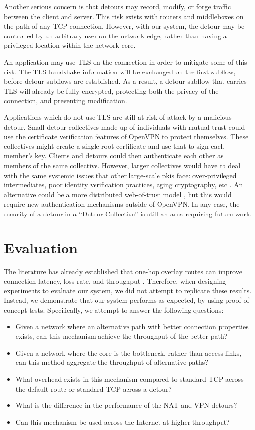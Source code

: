 \documentclass{cwru}
\begin{document}
Another serious concern is that detours may record, modify, or forge traffic
between the client and server. This risk exists with routers and middleboxes on
the path of any TCP connection. However, with our system, the detour may be
controlled by an arbitrary user on the network edge, rather than having a
privileged location within the network core.

An application may use TLS on the connection in order to mitigate some of this
risk. The TLS handshake information will be exchanged on the first subflow,
before detour subflows are established. As a result, a detour subflow that
carries TLS will already be fully encrypted, protecting both the privacy of the
connection, and preventing modification.

Applications which do not use TLS are still at risk of attack by a malicious
detour. Small detour collectives made up of individuals with mutual trust could
use the certificate verification features of OpenVPN to protect themselves.
These collectives might create a single root certificate and use that to sign
each member's key. Clients and detours could then authenticate each other as
members of the same collective. However, larger collectives would have to deal
with the same systemic issues that other large-scale \acp{pki} face:
over-privileged intermediates, poor identity verification practices, aging
cryptography, etc \cite{durumeric2013analysis}. An alternative could be a more
distributed web-of-trust model \cite{abdul1997pgp}, but this would require new
authentication mechanisms outside of OpenVPN. In any case, the security of a
detour in a ``Detour Collective'' is still an area requiring future work.

\chapter{Evaluation}
\label{c:eval}

The literature has already established that one-hop overlay routes can improve
connection latency, loss rate, and throughput
\cite{detour,ron,gummadi2004improving}. Therefore, when designing experiments to
evaluate our system, we did not attempt to replicate these results. Instead, we
demonstrate that our system performs as expected, by using proof-of-concept
tests. Specifically, we attempt to answer the following questions:

\begin{itemize}
\item Given a network where an alternative path with better connection
  properties exists, can this mechanism achieve the throughput of the better
  path?
\item Given a network where the core is the bottleneck, rather than access
  links, can this method aggregate the throughput of alternative paths?
\item What overhead exists in this mechanism compared to standard TCP across the
  default route or standard TCP across a detour?
\item What is the difference in the performance of the NAT and VPN detours?
\item Can this mechanism be used across the Internet at higher throughput?
\end{itemize}
\end{document}
